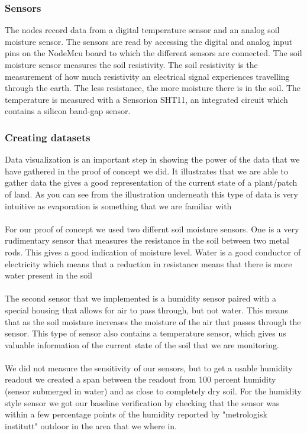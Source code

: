 \documentclass[]{uiophd}
\begin{document}
\subsubsection{Sensors}
The nodes record data from a digital temperature sensor and an analog soil moisture sensor. The sensors are read by accessing the digital and analog input pins on the NodeMcu board to which the different sensors are connected. The soil moisture sensor measures the soil resistivity. The soil resistivity is the measurement of how much resistivity an electrical signal experiences travelling through the earth. The less resistance, the more moisture there is in the soil. The temperature is measured with a Sensorion SHT11, an integrated circuit which contains a silicon band-gap sensor.

\subsubsection{Creating datasets}
Data visualization is an important step in showing the power of the data that we have gathered in the proof of concept we did. It illustrates that we are able to gather data the gives a good representation of the current state of a plant/patch of land. As you can see from the illustration underneath this type of data is very intuitive as evaporation is something that we are familiar with
\\\\
For our proof of concept we used two differnt soil moisture sensors. One is a very rudimentary sensor that measures the resistance in the soil between two metal rods. This gives a good indication of moisture level. Water is a good conductor of electricity which means that a reduction in resistance means that there is more water present in the soil
\\\\
The second sensor that we implemented is a humidity sensor paired with a special housing that allows for air to pass through, but not water. This means that as the soil moisture increases the moisture of the air that passes through the sensor. This type of sensor also contains a temperature sensor, which gives us valuable information of the current state of the soil that we are monitoring.
\\\\
We did not measure the sensitivity of our sensors, but to get a usable humidity readout we created a span between the readout from 100 percent humidity (sensor submerged in water) and as close to completely dry soil. For the humidity style sensor we got our baseline verification by checking that the sensor was within a few percentage points of the humidity reported by "metrologisk institutt" outdoor in the area that we where in.
\end{document}
